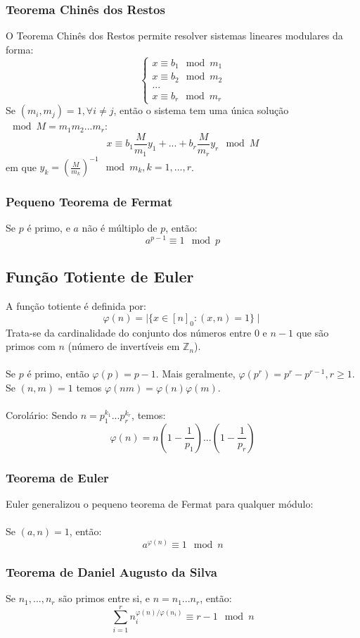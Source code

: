 \documentclass[10pt,a4paper]{report}
\begin{document}
\subsubsection{Teorema Chinês dos Restos}
O Teorema Chinês dos Restos permite resolver sistemas lineares modulares da forma:\\
\begin{equation}
\begin{cases}
x \equiv b_1 \mod m_1\\
x \equiv b_2 \mod m_2\\
...\\
x \equiv b_r \mod m_r
\end{cases}
\end{equation}
Se $(m_i, m_j) = 1, \forall i \neq j$, então o sistema tem uma única solução $\mod M = m_1m_2...m_r$:
$$
x \equiv b_1 \frac{M}{m_1}y_1 + ... + b_r \frac{M}{m_r}y_r \mod M
$$
em que $y_k = \left(\frac{M}{m_k}\right)^{-1} \mod m_k, k = 1, ..., r$.
\subsubsection{Pequeno Teorema de Fermat}
Se $p$ é primo, e $a$ não é múltiplo de $p$, então:$$
a^{p-1} \equiv 1 \mod p
$$
\subsection{Função Totiente de Euler}
A função totiente é definida por:
$$
\varphi(n) = \mid\{x \in [n]_0 : (x, n) = 1\}\mid
$$
Trata-se da cardinalidade do conjunto dos números entre 0 e $n - 1$ que são primos com $n$ (número de invertíveis em $\mathbb{Z}_n$).\\
\\
Se $p$ é primo, então $\varphi(p) = p-1$. Mais geralmente, $\varphi(p^r) = p^r - p^{r-1}, r \geq 1$. Se $(n,m) = 1$ temos $\varphi(nm) = \varphi(n)\varphi(m)$.\\
\\
Corolário: Sendo $n = p_1^{k_1}...p_r^{k_r}$, temos:
$$
\varphi(n) = n \left(1-\frac{1}{p_1}\right)...\left(1-\frac{1}{p_r}\right)
$$
\subsubsection{Teorema de Euler}
Euler generalizou o pequeno teorema de Fermat para qualquer módulo:\\
\\
Se $(a,n) = 1$, então:
$$
a^{\varphi(n)} \equiv 1 \mod n
$$
\subsubsection{Teorema de Daniel Augusto da Silva}
Se $n_1, ..., n_r$ são primos entre si, e $n = n_1...n_r$, então:
$$
\sum_{i=1}^{r} n_i^{\varphi(n)/\varphi(n_i)} \equiv r - 1 \mod n
$$
\end{document}
